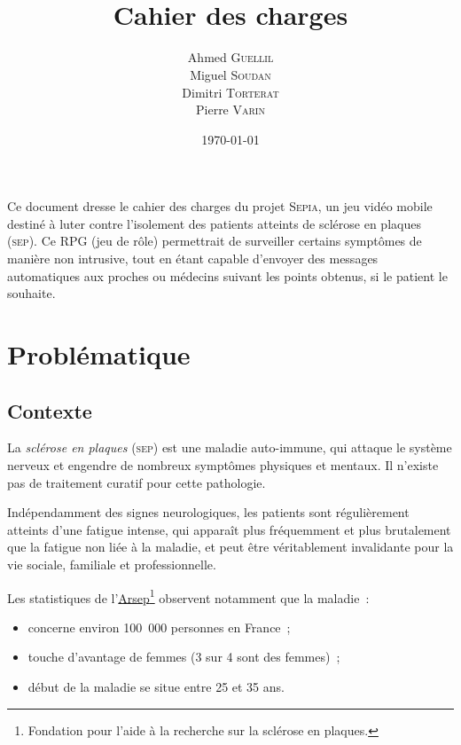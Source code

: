\documentclass[a4paper,12pt,francais]{article}
\title{\Sepia\\Cahier des charges}
\author{Ahmed \textsc{Guellil}\\
  Miguel \textsc{Soudan}\\
  Dimitri \textsc{Torterat}\\
  Pierre \textsc{Varin}
}
\date{\today} %
\newcommand{\SEP}{\textsc{sep}\xspace}
\newcommand{\Sepia}{\textsc{Sepia}\xspace}
\begin{document}
\renewcommand{\labelitemii}{–}
\renewcommand{\contentsname}{Sommaire}

\maketitle

Ce document dresse le cahier des charges du projet \Sepia, un jeu vidéo mobile destiné à luter contre l’isolement des patients atteints de sclérose en plaques (\SEP). Ce RPG (jeu de rôle) permettrait de surveiller certains symptômes de manière non intrusive, tout en étant capable d’envoyer des messages automatiques aux proches ou médecins suivant les points obtenus, si le patient le souhaite.


\newpage
\tableofcontents
\newpage

\section{Problématique}
\subsection{Contexte}

La \emph{sclérose en plaques} (\SEP{}) est une maladie auto-immune, qui attaque le système nerveux et engendre de nombreux symptômes physiques et mentaux. Il n’existe pas de traitement curatif pour cette pathologie.

Indépendamment des signes neurologiques, les patients sont régulièrement atteints d’une fatigue intense, qui apparaît plus fréquemment et plus brutalement que la fatigue non liée à la maladie, et peut être véritablement invalidante pour la vie sociale, familiale et professionnelle.

Les statistiques de l’\href{https://www.arsep.org/fr/168-d%C3%A9finition%20et%20chiffres.html}{Arsep}\footnote{Fondation pour l'aide à la recherche sur la sclérose en plaques.} observent notamment que la maladie~:
\begin{itemize}
\item concerne environ 100~000 personnes en France~;
\item touche d’avantage de femmes (3 sur 4 sont des femmes)~;
\item début de la maladie se situe entre 25 et 35 ans.
\end{itemize}
\end{document}
